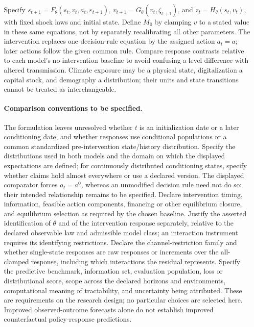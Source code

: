 \documentclass[11pt,a4paper]{article}
\begin{document}
Specify \(s_{t+1}=F_\theta(s_t,v_t,a_t,\varepsilon_{t+1})\), \(v_{t+1}=G_\theta(v_t,\zeta_{t+1})\), and \(z_t=H_\theta(s_t,v_t)\), with fixed shock laws and initial state. Define \(M_0\) by clamping \(v\) to a stated value in these same equations, not by separately recalibrating all other parameters. The intervention replaces one decision-rule equation by the assigned action \(a_t=a\); later actions follow the given common rule. Compare response contrasts relative to each model's no-intervention baseline to avoid confusing a level difference with altered transmission. Climate exposure may be a physical state, digitalization a capital stock, and demography a distribution; their units and state transitions cannot be treated as interchangeable.

\paragraph{Comparison conventions to be specified.} The formulation leaves unresolved whether \(t\) is an initialization date or a later conditioning date, and whether responses use conditional populations or a common standardized pre-intervention state/history distribution. Specify the distributions used in both models and the domain on which the displayed expectations are defined; for continuously distributed conditioning states, specify whether claims hold almost everywhere or use a declared version. The displayed comparator forces \(a_t=a^0\), whereas an unmodified decision rule need not do so: their intended relationship remains to be specified. Declare intervention timing, information, feasible action components, financing or other equilibrium closure, and equilibrium selection as required by the chosen baseline. Justify the asserted identification of \(\theta\) and of the intervention response separately, relative to the declared observable law and admissible model class; an interaction instrument requires its identifying restrictions. Declare the channel-restriction family and whether single-state responses are raw responses or increments over the all-clamped response, including which interactions the residual represents. Specify the predictive benchmark, information set, evaluation population, loss or distributional score, scope across the declared horizons and environments, computational meaning of tractability, and uncertainty being attributed. These are requirements on the research design; no particular choices are selected here. Improved observed-outcome forecasts alone do not establish improved counterfactual policy-response predictions.
\end{document}
